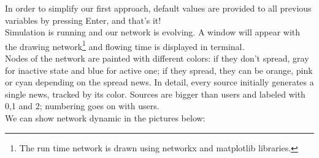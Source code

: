 In order to simplify our first approach, default values are provided to all previous variables by pressing Enter, and that's it!\\
Simulation is running and our network is evolving. A window will appear with the drawing network\footnote{The run time network is drawn using networkx and matplotlib libraries.} and flowing time is displayed in terminal. \\
Nodes of the network are painted with different colors: if they don't spread, gray for inactive state and blue for active one; if they spread, they can be orange, pink or cyan depending on the spread news. In detail, every source initially generates a single news, tracked by its color. Sources are bigger than users and labeled with 0,1 and 2; numbering goes on with users.\\
We can show network dynamic in the pictures below:
